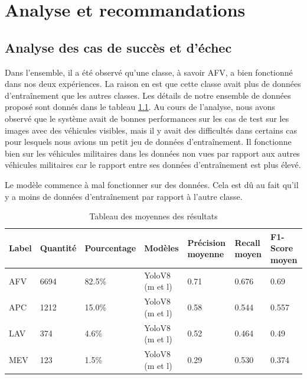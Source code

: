 \chapter{Analyse et recommandations}
\label{chap:4}
\sloppy

\section{Analyse des cas de succès et d'échec}

Dans l'ensemble, il a été observé qu'une classe, à savoir AFV, a bien fonctionné dans nos deux expériences.
La raison en est que cette classe avait plus de données d'entraînement que les autres classes.
Les détails de notre ensemble de données proposé sont donnés dans le tableau \ref{tab:label_data}.
Au cours de l'analyse, nous avons observé que le système avait de bonnes performances sur les cas de test sur les images avec des véhicules visibles, mais il y avait des difficultés dans certains cas pour lesquels nous avions un petit jeu de données d'entraînement.
Il fonctionne bien sur les véhicules militaires dans les données non vues par rapport aux autres véhicules militaires car le rapport entre ses données d'entraînement est plus élevé.

Le modèle commence à mal fonctionner sur des données. Cela est dû au fait qu'il y a moins de données d'entraînement par rapport à l'autre classe.

\begin{table}[H]
    \centering
    \begin{tabular}{|l|l|l|p{2.8cm}|p{2cm}|p{2cm}|p{2cm}|}
        \hline
        \textbf{Label} & \textbf{Quantité} & \textbf{Pourcentage} & \textbf{Modèles} & \textbf{Précision moyenne} & \textbf{Recall moyen} & \textbf{F1-Score moyen} \\ \hline
        AFV            & 6694              & 82.5\%               & YoloV8 (m et l)  & 0.71                       & 0.676                 & 0.69                    \\ \hline
        APC            & 1212              & 15.0\%               & YoloV8 (m et l)  & 0.58                       & 0.544                 & 0.557                   \\ \hline
        LAV            & 374               & 4.6\%                & YoloV8 (m et l)  & 0.52                       & 0.464                 & 0.49                    \\ \hline
        MEV            & 123               & 1.5\%                & YoloV8 (m et l)  & 0.29                       & 0.530                 & 0.374                   \\ \hline
    \end{tabular}
    \caption{Tableau des moyennes des résultats}
    \label{tab:label_data}
\end{table}


